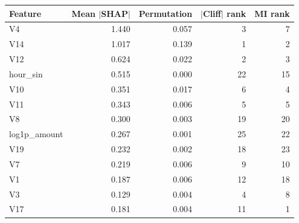 \begin{tabular}{lrrrr}
\toprule
Feature & Mean $|$SHAP$|$ & Permutation & $|$Cliff$|$ rank & MI rank \\
\midrule
V4 & 1.440 & 0.057 & 3 & 7 \\
V14 & 1.017 & 0.139 & 1 & 2 \\
V12 & 0.624 & 0.022 & 2 & 3 \\
hour\_sin & 0.515 & 0.000 & 22 & 15 \\
V10 & 0.351 & 0.017 & 6 & 4 \\
V11 & 0.343 & 0.006 & 5 & 5 \\
V8 & 0.300 & 0.003 & 19 & 20 \\
log1p\_amount & 0.267 & 0.001 & 25 & 22 \\
V19 & 0.232 & 0.002 & 18 & 23 \\
V7 & 0.219 & 0.006 & 9 & 10 \\
V1 & 0.187 & 0.006 & 12 & 18 \\
V3 & 0.129 & 0.004 & 4 & 8 \\
V17 & 0.181 & 0.004 & 11 & 1 \\
\bottomrule
\end{tabular}
